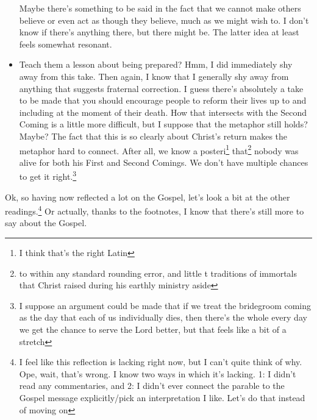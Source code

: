 \documentclass[12pt]{article}[titlepage]
\newcommand{\1}{\={a}}
\newcommand{\2}{\={e}}
\newcommand{\3}{\={\i}}
\newcommand{\4}{\=o}
\newcommand{\5}{\=u}
\newcommand{\6}{\={A}}
\renewcommand{\,}{\textsuperscript{,}}
\begin{document}
\begin{itemize}
Maybe there's something to be said in the fact that we cannot make others believe or even act as though they believe, much as we might wish to.
I don't know if there's anything there, but there might be.
The latter idea at least feels somewhat resonant.
\item Teach them a lesson about being prepared?
Hmm, I did immediately shy away from this take.
Then again, I know that I generally shy away from anything that suggests fraternal correction.
I guess there's absolutely a take to be made that you should encourage people to reform their lives up to and including at the moment of their death.
How that intersects with the Second Coming is a little more difficult, but I suppose that the metaphor still holds? Maybe?
The fact that this is so clearly about Christ's return makes the metaphor hard to connect.
After all, we know a posteri\footnote{I think that's the right Latin} that\footnote{to within any standard rounding error, and little t traditions of immortals that Christ raised during his earthly ministry aside} nobody was alive for both his First and Second Comings.
We don't have multiple chances to get it right.\footnote{I suppose an argument could be made that if we treat the bridegroom coming as the day that each of us individually dies, then there's the whole every day we get the chance to serve the Lord better, but that feels like a bit of a stretch}
\end{itemize}

Ok, so having now reflected a lot on the Gospel, let's look a bit at the other readings.\footnote{I feel like this reflection is lacking right now, but I can't quite think of why.
Ope, wait, that's wrong. I know two ways in which it's lacking. 1: I didn't read any commentaries, and 2: I didn't ever connect the parable to the Gospel message explicitly/pick an interpretation I like.
Let's do that instead of moving on}
Or actually, thanks to the footnotes, I know that there's still more to say about the Gospel.
\end{document}
